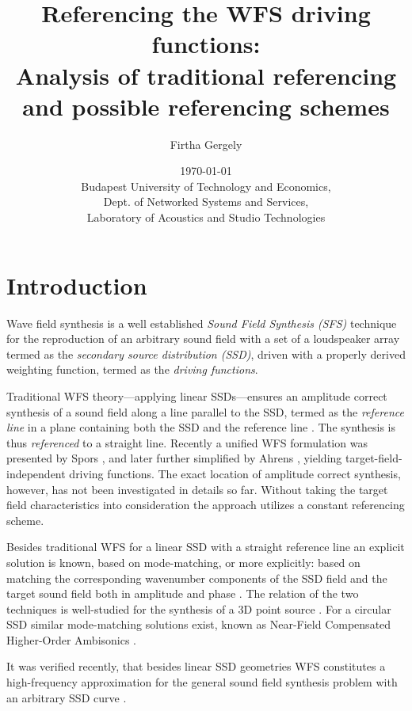 \documentclass[12pt,a4paper]{article}
\title{Referencing the WFS driving functions:\\
Analysis of traditional referencing and possible referencing schemes}
\date{\today \\
Budapest University of Technology and Economics, \\ Dept. of Networked Systems and Services, \\ Laboratory of Acoustics and Studio Technologies}
\author{Firtha Gergely}
\begin{document}
\maketitle

\section{Introduction}

Wave field synthesis is a well established \emph{Sound Field Synthesis (SFS)} technique for the reproduction of an arbitrary sound field with a set of a loudspeaker array termed as the \emph{secondary source distribution (SSD)}, driven with a properly derived weighting function, termed as the \emph{driving functions}. 

Traditional WFS theory---applying linear SSDs---ensures an amplitude correct synthesis of a sound field along a line parallel to the SSD, termed as the \emph{reference line} in a plane containing both the SSD and the reference line \cite{Berkhout1993:Acoustic_control_by_WFS, Berkhout1988, Verheijen1997:phd, Vogel1993:phd, Start1997:phd}. The synthesis is thus \emph{referenced} to a straight line. Recently a unified WFS formulation was presented by Spors \cite{Spors2008:WFSrevisited}, and later further simplified by Ahrens \cite{Ahrens2010phd, Ahrens2012}, yielding target-field-independent driving functions. The exact location of amplitude correct synthesis, however, has not been investigated in details so far. Without taking the target field characteristics into consideration the approach utilizes a constant referencing scheme.

Besides traditional WFS for a linear SSD with a straight reference line an explicit solution is known, based on mode-matching, or more explicitly: based on matching the corresponding wavenumber components of the SSD field and the target sound field both in amplitude and phase \cite{Ahrens2010a, Ahrens2010:Ambisonics_w_planar_linear}. The relation of the two techniques is well-studied for the synthesis of a 3D point source \cite{Spors2010:analysis_and_improvement}. For a circular SSD similar mode-matching solutions exist, known as Near-Field Compensated Higher-Order Ambisonics \cite{Ahrens2008:Analytical_Circ_Spherical_SFS}.

It was verified recently, that besides linear SSD geometries WFS constitutes a high-frequency approximation for the general sound field synthesis problem with an arbitrary SSD curve \cite{Fazi2013:Equivalent_scattering, Zotter2013:uniqueness}.
\end{document}
